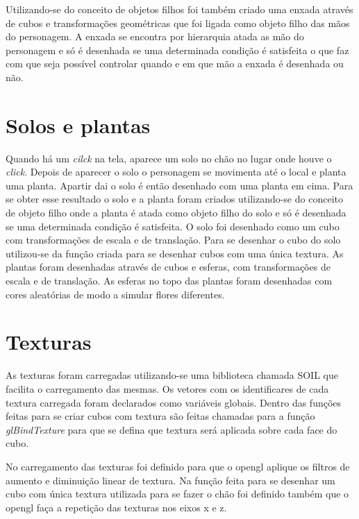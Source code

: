 \documentclass[
	12pt,				%
	openright,			%
	a4paper,			%
	english,			%
	french,				%
	spanish,			%
	brazil,				%
	]{abntex2}
\begin{document}
Utilizando-se do conceito de objetos filhos foi também criado uma enxada através de cubos e transformações geométricas que foi ligada como objeto filho das mãos do personagem. A enxada se encontra por hierarquia atada as mão do personagem e só é desenhada  se uma determinada condição é satisfeita o que faz com que seja possível controlar quando e em que mão a enxada é desenhada ou não. 
    


\section{Solos e plantas}
\label{subsec:planta}
	
	Quando há um \emph{cilck} na tela, aparece um solo no chão no lugar onde houve o \emph{click}. Depois de aparecer o solo o personagem se movimenta até o local e planta uma planta. Apartir dai o solo é então desenhado com uma planta em cima. Para se obter esse resultado o solo e a planta foram criados utilizando-se do conceito de objeto filho onde a planta é atada como objeto filho do solo e só é desenhada se uma determinada condição é satisfeita.
 	O solo foi desenhado como um cubo com transformações de escala e de translação. Para se desenhar o cubo do solo utilizou-se da função criada para se desenhar cubos com uma única textura. As plantas foram desenhadas através de cubos e esferas, com transformações de escala e de translação. As esferas no topo das plantas foram desenhadas com cores aleatórias de modo a simular flores diferentes.
  


\section{Texturas}

	As texturas foram carregadas utilizando-se uma biblioteca chamada SOIL que facilita o carregamento das mesmas. Os vetores com os identificares de cada textura carregada foram declarados como variáveis globais. Dentro das funções feitas para se criar cubos com textura são feitas chamadas para a função \emph{glBindTexture} para que se defina que textura será aplicada sobre cada face do cubo. 

	No carregamento das texturas foi definido para que o opengl aplique os filtros de aumento e diminuição linear de textura. Na função feita para se desenhar um cubo com única textura utilizada para se fazer o chão  foi definido também que o opengl faça a repetição das texturas nos eixos x e z. 
	
\end{document}
